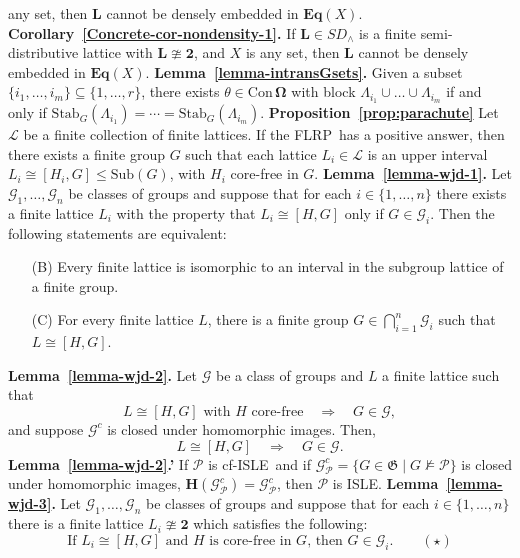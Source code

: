 \documentclass[cm,dissertation,actual,final]{uhthesis}
\theoremstyle{plain}
\theoremstyle{definition}
\theoremstyle{remark}
\numberwithin{theorem}{section}
\numberwithin{claim}{chapter}
\numberwithin{equation}{section}
\numberwithin{conjecture}{chapter}
\newcommand{\<}{\ensuremath{\langle}}
\renewcommand{\>}{\ensuremath{\rangle}}
\renewcommand{\leq}{\ensuremath{\leqslant}}
\newcommand{\bEqX}{\ensuremath{\mathbf{Eq}(X)}}
\newcommand{\Stab}{\ensuremath{\mathrm{Stab}}}
\newcommand{\Con}{\ensuremath{\mathrm{Con\,}}}
\newcommand{\Sub}{\ensuremath{\mathrm{Sub}}}
\newcommand{\FLRP}{{\small FLRP}}
\newcommand{\0}{\ensuremath{\mathbf{0}}}
\newcommand{\1}{\ensuremath{\mathbf{1}}}
\newcommand{\2}{\ensuremath{\mathbf{2}}}
\newcommand{\3}{\ensuremath{\mathbf{3}}}
\newcommand{\4}{\ensuremath{\mathbf{4}}}
\newcommand{\5}{\ensuremath{\mathbf{5}}}
\newcommand{\sG}{\ensuremath{\mathscr{G}}}
\newcommand{\G}{\ensuremath{\mathfrak{G}}}
\newcommand{\bH}{\ensuremath{\mathbf{H}}}
\newcommand{\bL}{\ensuremath{\mathbf{L}}}
\newcommand{\sL}{\ensuremath{\mathscr{L}}}
\newcommand{\bOmega}{\ensuremath{\alg \Omega}}
\newcommand{\ConO}{\ensuremath{\Con \bOmega}}
\newcommand{\cP}{\ensuremath{\mathcal{P}}}
\newcommand{\ISLE}{{\small ISLE}}
\newcommand{\alg}[1]{\mathbf{#1}}
\newcommand{\two}{\ensuremath{\mathbf{2}}}
\begin{document}
any set, then $\bL$ cannot be densely embedded in $\bEqX$.
\vskip4mm \noindent
{\bf Corollary~\ref{Concrete-cor-nondensity-1}.}
If $\bL\in SD_\wedge$ is a finite semi-distributive lattice with $\bL\ncong \mathbf{2}$, 
and $X$ is any set, then $\bL$ cannot be densely embedded in $\bEqX$.
\vskip4mm \noindent
{\bf Lemma~\ref{lemma-intransGsets}.}
Given a subset $\{i_1, \dots, i_m\} \subseteq \{1,\dots, r\}$, 
there exists $\theta \in \ConO$ with block $\Lambda_{i_1} \cup \dots \cup
\Lambda_{i_m}$ if and only if $\Stab_G(\Lambda_{i_1}) = \cdots =
\Stab_G(\Lambda_{i_m})$.
\vskip4mm \noindent
{\bf Proposition~\ref{prop:parachute}}
  Let $\sL$ be a finite collection of finite lattices.
  If the \FLRP\ has a positive answer, then there exists a finite group $G$ such
  that each lattice $L_i \in \sL$ is an upper interval $L_i\cong [H_i, G] \leq
  \Sub(G)$, with $H_i$ core-free in $G$. 
\vskip4mm \noindent
{\bf Lemma~\ref{lemma-wjd-1}.}
Let $\sG_1, \dots, \sG_n$ be classes of groups and suppose that for each $i\in
\{1, \dots, n\}$ there exists a finite lattice $L_i$ with the property that
$L_i \cong [H, G]$ only if $G\in \sG_i$.
Then the following statements are equivalent:
\begin{enumerate}
\item[(B)] Every finite lattice is isomorphic to
  an interval in the subgroup lattice of a finite group.
\item[(C)] For every finite lattice $L$, there is a finite group $G \in
  \bigcap\limits_{i=1}^n \sG_i$ such that $L \cong [H,G]$.
\end{enumerate}
\vskip4mm \noindent
{\bf Lemma~\ref{lemma-wjd-2}.}
Let $\sG$ be a class of groups and $L$ a finite lattice such that
\begin{equation*}
L \cong [H,G] \text{ with $H$ core-free} \quad \Rightarrow \quad G\in \sG,
\end{equation*}
and suppose $\sG^c$ is closed under homomorphic images.  Then, 
\begin{equation*}
L \cong [H,G] \quad \Rightarrow \quad G\in \sG.
\end{equation*}
\vskip4mm \noindent
{\bf Lemma~\ref{lemma-wjd-2}.'}
If $\cP$ is cf-\ISLE\ and if $\sG_{\cP}^c = \{G\in \G \mid G\nvDash \cP\}$
is closed under homomorphic images, $\bH(\sG_{\cP}^c) = \sG_{\cP}^c$, then $\cP$ is \ISLE.
\vskip4mm \noindent
{\bf Lemma~\ref{lemma-wjd-3}.}
Let $\sG_1, \dots, \sG_n$ be classes of groups and  
suppose that for each $i\in \{1, \dots, n\}$ there is a finite lattice $L_i\ncong \two$
which satisfies the following:
\[
\text{If $L_i\cong [H,G]$ and $H$ is core-free in $G$, then $G\in
  {\sG_i}$}. \qquad (\star)
\]
\end{document}
